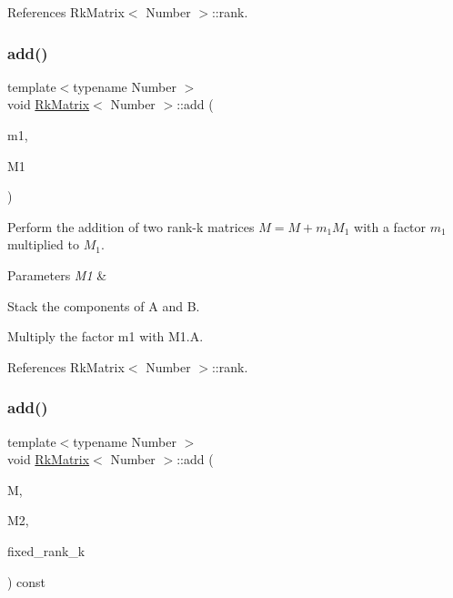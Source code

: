 References Rk\+Matrix$<$ Number $>$\+::rank.

\mbox{\label{classRkMatrix_a93b434797b9142a4dce0c6a64ba1e89c}} 
\subsubsection{\texorpdfstring{add()}{add()}\hspace{0.1cm}{\footnotesize\ttfamily [4/8]}}
{\footnotesize\ttfamily template$<$typename Number $>$ \\
void \hyperlink{classRkMatrix}{Rk\+Matrix}$<$ Number $>$\+::add (\begin{DoxyParamCaption}\item[{const Number}]{m1,  }\item[{const \hyperlink{classRkMatrix}{Rk\+Matrix}$<$ Number $>$ \&}]{M1 }\end{DoxyParamCaption})}

Perform the addition of two rank-\/k matrices $M = M + m_1 M_1$ with a factor $m_1$ multiplied to $M_1$. 
\begin{DoxyParams}{Parameters}
{\em M1} & \\
\hline
\end{DoxyParams}
Stack the components of {\ttfamily A} and {\ttfamily B}.

Multiply the factor {\ttfamily m1} with {\ttfamily M1.\+A}.

References Rk\+Matrix$<$ Number $>$\+::rank.

\mbox{\label{classRkMatrix_ad8668d42978011b3e65d0381bfb068d5}} 
\subsubsection{\texorpdfstring{add()}{add()}\hspace{0.1cm}{\footnotesize\ttfamily [5/8]}}
{\footnotesize\ttfamily template$<$typename Number $>$ \\
void \hyperlink{classRkMatrix}{Rk\+Matrix}$<$ Number $>$\+::add (\begin{DoxyParamCaption}\item[{\hyperlink{classRkMatrix}{Rk\+Matrix}$<$ Number $>$ \&}]{M,  }\item[{const \hyperlink{classRkMatrix}{Rk\+Matrix}$<$ Number $>$ \&}]{M2,  }\item[{const \hyperlink{classRkMatrix_add060bfc3a4cc77f858c3d6dd58cadd5}{size\+\_\+type}}]{fixed\+\_\+rank\+\_\+k }\end{DoxyParamCaption}) const}

